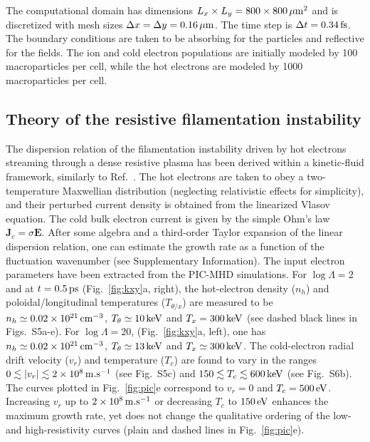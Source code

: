 \documentclass[aps,twocolumn,showpacs,superscriptaddress]{revtex4}
\begin{document}
The computational domain has dimensions
$L_x\times L_y=800 \times 800\,\rm \mu m^2$ and is discretized with mesh sizes $\Delta x=\Delta y =0.16\,\rm \mu m$. The time step is $\Delta t=0.34\,\rm fs$. The boundary conditions are taken to be absorbing for the particles and reflective for the fields. The ion and cold electron populations are initially modeled by 100 macroparticles per cell, while the hot electrons are modeled by 1000 macroparticles per cell. 


\subsection*{Theory of the resistive filamentation instability}

The dispersion relation of the filamentation instability driven by hot electrons streaming through a dense resistive plasma has been derived within a kinetic-fluid framework, similarly to Ref.~\cite{POP_Gremillet_2002}. The hot electrons are taken to obey a two-temperature Maxwellian distribution (neglecting relativistic effects for simplicity), and their perturbed current density is obtained from the linearized Vlasov equation. The cold bulk electron current is given by the simple Ohm's law $\mathbf{J}_c=\sigma \mathbf{E}$.
After some algebra and a third-order Taylor expansion of the linear dispersion relation, one can estimate the growth rate as a function of the fluctuation wavenumber (see Supplementary Information). The input electron parameters have been extracted from the PIC-MHD simulations. For $\log \Lambda=2$ and at $t=0.5\,\rm ps$ (Fig.~\ref{fig:kxy}a, right), the hot-electron density ($n_h$) and poloidal/longitudinal temperatures ($T_{\theta/x}$) are measured to be $n_h\simeq 0.02 \times 10^{21}\,\rm cm^{-3}$, $T_\theta \simeq 10\,\rm keV$ and $T_x= 300\,\rm keV $ (see dashed black lines in Figs.~S5a-e). For $\log \Lambda =20$, (Fig.~\ref{fig:kxy}a, left), one has $n_h \simeq 0.02 \times 10^{21}\,\rm cm^{-3}$,  $T_\theta \simeq 13\,\rm keV$ and $T_x \simeq 300\,\rm keV$. The cold-electron radial drift velocity ($v_r$) and temperature ($T_c$) are found to vary in the ranges $0\lesssim \vert v_r \vert \lesssim 2\times 10^8 \,\rm m.s^{-1}$ (see Fig.~S5c) and $150 \lesssim T_c \lesssim 600\,\rm keV$ (see Fig.~S6b). The curves plotted in Fig.~\ref{fig:pic}e correspond to $v_r = 0$ and $T_c=500\,\rm eV$.
Increasing $v_r$ up to $2\times 10^8 \,\rm m.s^{-1}$ or decreasing $T_c$ to $150\,\rm eV$ enhances the maximum growth rate, yet does not change the qualitative ordering of the low- and high-resistivity curves (plain and dashed lines in Fig.~\ref{fig:pic}e).
\end{document}
